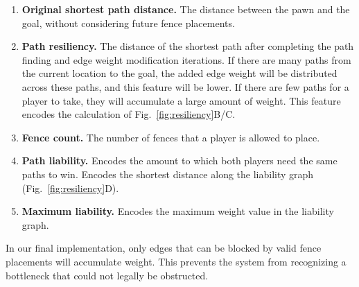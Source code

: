 \documentclass[10pt]{article}
\begin{document}
\begin{enumerate}
    \item \textbf{Original shortest path distance.} The distance between the pawn and the goal, without considering future fence placements.
    \item \textbf{Path resiliency.} The distance of the shortest path after completing the path finding and edge weight modification iterations. If there are many paths from the current location to the goal, the added edge weight will be distributed across these paths, and this feature will be lower. If there are few paths for a player to take, they will accumulate a large amount of weight. This feature encodes the calculation of Fig.~\ref{fig:resiliency}B/C.
    \item \textbf{Fence count.} The number of fences that a player is allowed to place.
    \item \textbf{Path liability.} Encodes the amount to which both players need the same paths to win. Encodes the shortest distance along the liability graph (Fig.~\ref{fig:resiliency}D).
    \item \textbf{Maximum liability.} Encodes the maximum weight value in the liability graph.
\end{enumerate}

In our final implementation, only edges that can be blocked by valid fence placements will accumulate weight. This prevents the system from recognizing a bottleneck that could not legally be obstructed.

\end{document}

